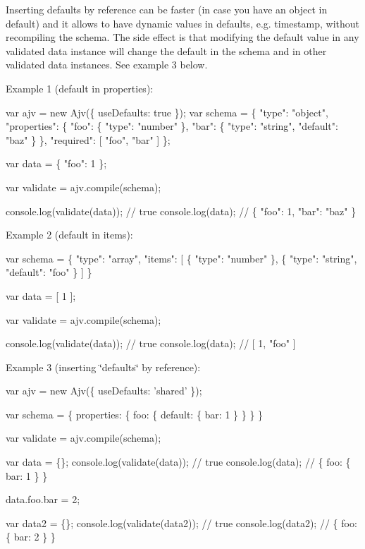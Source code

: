 Inserting defaults by reference can be faster (in case you have an object in {\ttfamily default}) and it allows to have dynamic values in defaults, e.\+g. timestamp, without recompiling the schema. The side effect is that modifying the default value in any validated data instance will change the default in the schema and in other validated data instances. See example 3 below.

Example 1 ({\ttfamily default} in {\ttfamily properties})\+:


\begin{DoxyCode}
var ajv = new Ajv(\{ useDefaults: true \});
var schema = \{
  "type": "object",
  "properties": \{
    "foo": \{ "type": "number" \},
    "bar": \{ "type": "string", "default": "baz" \}
  \},
  "required": [ "foo", "bar" ]
\};

var data = \{ "foo": 1 \};

var validate = ajv.compile(schema);

console.log(validate(data)); // true
console.log(data); // \{ "foo": 1, "bar": "baz" \}
\end{DoxyCode}


Example 2 ({\ttfamily default} in {\ttfamily items})\+:


\begin{DoxyCode}
var schema = \{
  "type": "array",
  "items": [
    \{ "type": "number" \},
    \{ "type": "string", "default": "foo" \}
  ]
\}

var data = [ 1 ];

var validate = ajv.compile(schema);

console.log(validate(data)); // true
console.log(data); // [ 1, "foo" ]
\end{DoxyCode}


Example 3 (inserting \char`\"{}defaults\char`\"{} by reference)\+:


\begin{DoxyCode}
var ajv = new Ajv(\{ useDefaults: 'shared' \});

var schema = \{
  properties: \{
    foo: \{
      default: \{ bar: 1 \}
    \}
  \}
\}

var validate = ajv.compile(schema);

var data = \{\};
console.log(validate(data)); // true
console.log(data); // \{ foo: \{ bar: 1 \} \}

data.foo.bar = 2;

var data2 = \{\};
console.log(validate(data2)); // true
console.log(data2); // \{ foo: \{ bar: 2 \} \}
\end{DoxyCode}


